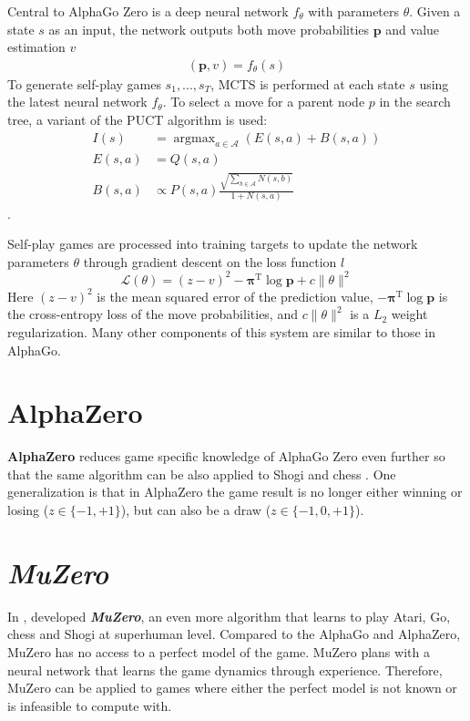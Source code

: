 Central to AlphaGo Zero is a deep neural network $f_\theta$ with parameters $\theta$.
Given a state $s$ as an input, the network outputs both move probabilities $\pmb{p}$ and value estimation $v$
\begin{align*}
    (\mathbf{p}, v) = f_\theta(s)
\end{align*}
To generate self-play games $s_1, ..., s_T$, MCTS is performed at each state $s$ using the latest neural network $f_\theta$.
To select a move for a parent node $p$ in the search tree, a variant of the PUCT algorithm is used:
\begin{align*}
    I(s)     & = \operatorname{argmax}_{a \in \mathcal{A}} \left( E(s, a) + B(s, a) \right)  \\
    E(s, a)  & = Q(s, a)  \\
    B(s, a)  & \propto P(s, a) \frac{\sqrt{\sum_{b \in \mathcal{A}}{N(s, b)}}}{1+N(s, a)}
\end{align*} \label{sec:puct}.

Self-play games are processed into training targets to update the network parameters $\theta$ through gradient descent on the loss function $l$
\begin{equation*}
    \mathcal{L}(\theta) = (z-v)^{2} - \pmb{\pi}^{\mathrm{T}} \log \pmb{p}+c\|\theta\|^{2}
\end{equation*}
Here $(z-v)^2$ is the mean squared error of the prediction value,
$-\pmb{\pi}^{\mathrm{T}} \log \pmb{p}$ is the cross-entropy loss of the move probabilities,
and $c\|\theta\|^2$ is a $L_2$ weight regularization.
Many other components of this system are similar to those in AlphaGo.

\section{AlphaZero}
\textbf{AlphaZero} reduces game specific knowledge of AlphaGo Zero even further so that the same algorithm can be also applied to Shogi and chess
\cite{MasteringChessShogi_Silver.Hubert.ea_2017}.
One generalization is that in AlphaZero the game result is no longer either winning or losing ($z \in \{ -1, +1 \}$), but can also be a draw ($z \in \{-1, 0, +1 \}$).

\section{\textit{MuZero}} \label{sec:muzero}
In \citeyear{MasteringAtariGo_Schrittwieser.Antonoglou.ea_2020},
\citeauthor{MasteringAtariGo_Schrittwieser.Antonoglou.ea_2020} developed
\textbf{\textit{MuZero}}, an even more algorithm that learns to play Atari, Go, chess and Shogi at superhuman level.
Compared to the AlphaGo and AlphaZero,
MuZero has no access to a perfect model of the game.
MuZero plans with a neural network that learns the game dynamics through experience.
Therefore, MuZero can be applied to games where either the perfect model is not known or is infeasible to compute with.

